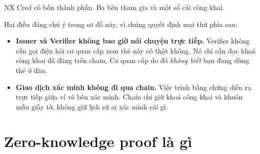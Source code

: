 \documentclass[a4paper,11pt]{article}
\begin{document}
NX Cred có bốn thành phần. Ba bên tham gia và một sổ cái công khai.

\begin{center}
\end{center}

Hai điều đáng chú ý trong sơ đồ này, vì chúng quyết định mọi thứ phía sau:

\begin{itemize}[leftmargin=1.2em,itemsep=4pt]
  \item \textbf{Issuer và Verifier không bao giờ nói chuyện trực tiếp.} Verifier không
        cần gọi điện hỏi cơ quan cấp xem thẻ này có thật không. Nó chỉ cần đọc khoá công
        khai đã đăng trên chain. Cơ quan cấp do đó \emph{không biết} bạn đang dùng thẻ ở đâu.
  \item \textbf{Giao dịch xác minh không đi qua chain.} Việc trình bằng chứng diễn ra
        trực tiếp giữa ví và bên xác minh. Chain chỉ giữ khoá công khai và khuôn mẫu
        giấy tờ, không giữ lịch sử ai xác minh cái gì.
\end{itemize}

\section{Zero-knowledge proof là gì}
\label{sec:zkp}
\end{document}
